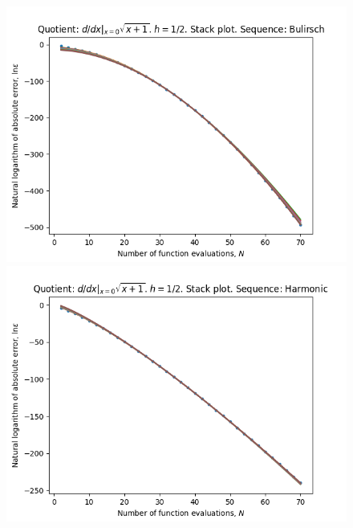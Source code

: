 \begin{figure}[H]
\centering
\begin{minipage}{0.45\textwidth}
\centering
\includegraphics[scale=0.45]{../results/diff_quot_plots/sqrt_1_hp_bulirsch_stack.png}
\end{minipage}
\begin{minipage}{0.45\textwidth}
\centering
\includegraphics[scale=0.45]{../results/diff_quot_plots/sqrt_1_hp_harmonic_stack.png}
\end{minipage}
\end{figure}

